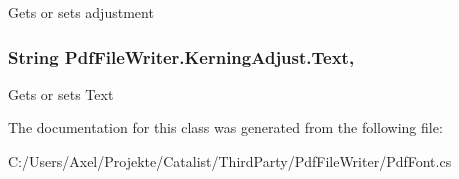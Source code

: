 Gets or sets adjustment 

\subsubsection[{\texorpdfstring{Text}{Text}}]{\setlength{\rightskip}{0pt plus 5cm}String Pdf\+File\+Writer.\+Kerning\+Adjust.\+Text\hspace{0.3cm}{\ttfamily [get]}, {\ttfamily [set]}}\hypertarget{class_pdf_file_writer_1_1_kerning_adjust_aea25b0c5624eb36bfff5d0a5f784e91f}{}\label{class_pdf_file_writer_1_1_kerning_adjust_aea25b0c5624eb36bfff5d0a5f784e91f}


Gets or sets Text 



The documentation for this class was generated from the following file\+:\begin{DoxyCompactItemize}
\item 
C\+:/\+Users/\+Axel/\+Projekte/\+Catalist/\+Third\+Party/\+Pdf\+File\+Writer/Pdf\+Font.\+cs\end{DoxyCompactItemize}
